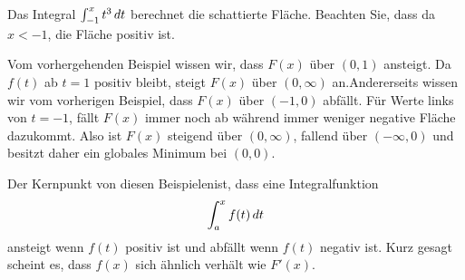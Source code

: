 \begin{marginfigure}
\caption{Das Integral $\int_{-1}^x t^3 \, d t$ berechnet die schattierte Fläche. Beachten Sie, dass da $x<-1$, die Fläche positiv ist.}
\label{figure:accumulationegreal}
\end{marginfigure}

\begin{solution}
Vom vorhergehenden Beispiel wissen wir, dass $F(x)$ über
$(0,1)$ ansteigt. Da $f(t)$ ab $t=1$ positiv bleibt, steigt
  $F(x)$ über $(0,\infty)$ an.Andererseits wissen wir vom vorherigen Beispiel, dass $F(x)$ über $(-1,0)$ abfällt. Für Werte
  links von $t=-1$, fällt $F(x)$ immer noch ab während immer weniger negative Fläche dazukommt. Also ist $F(x)$ steigend über $(0,\infty)$, fallend über $(-\infty,0)$ und besitzt daher ein globales Minimum bei $(0,0)$.
\end{solution}

Der Kernpunkt von diesen Beispielenist, dass eine Integralfunktion
\[
\int_a^x f(t) \, d t
\]
ansteigt wenn $f(t)$ positiv ist und abfällt wenn $f(t)$ negativ ist. Kurz gesagt scheint es, dass  $f(x)$ sich ähnlich verhält wie $F'(x)$.




